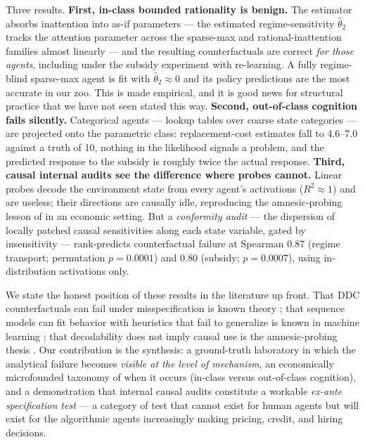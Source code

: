 \documentclass[11pt]{article}
\newcommand{\that}[1]{\widehat{\theta}_{#1}}
\begin{document}
Three results. \textbf{First, in-class bounded rationality is benign.} The
estimator absorbs inattention into as-if parameters --- the estimated
regime-sensitivity $\that{2}$ tracks the attention parameter across the
sparse-max and rational-inattention families almost linearly --- and the
resulting counterfactuals are correct \emph{for those agents}, including
under the subsidy experiment with re-learning. A fully regime-blind
sparse-max agent is fit with $\that{2}\approx 0$ and its policy predictions
are the most accurate in our zoo. This is \citet{fosgerau2020} made
empirical, and it is good news for structural practice that we have not seen
stated this way. \textbf{Second, out-of-class cognition fails silently.}
Categorical agents --- lookup tables over coarse state categories --- are
projected onto the parametric class: replacement-cost estimates fall to
4.6--7.0 against a truth of 10, nothing in the likelihood signals a problem,
and the predicted response to the subsidy is roughly twice the actual
response. \textbf{Third, causal internal audits see the difference where
probes cannot.} Linear probes decode the environment state from every
agent's activations ($R^2 \approx 1$) and are useless; their directions are
causally idle, reproducing the amnesic-probing lesson of \citet{elazar2021}
in an economic setting. But a \emph{conformity audit} --- the dispersion of
locally patched causal sensitivities along each state variable, gated by
insensitivity --- rank-predicts counterfactual failure at Spearman 0.87
(regime transport; permutation $p = 0.0001$) and 0.80 (subsidy;
$p = 0.0007$), using in-distribution activations only.

We state the honest position of these results in the literature up front.
That DDC counterfactuals can fail under misspecification is known theory
\citep{magnacthesmar2002, kalouptsidi2021, bugniura2019}; that sequence
models can fit behavior with heuristics that fail to generalize is known in
machine learning \citep{vafa2024, vafa2025}; that decodability does not
imply causal use is the amnesic-probing thesis \citep{elazar2021}. Our
contribution is the synthesis: a ground-truth laboratory in which the
analytical failure becomes \emph{visible at the level of mechanism}, an
economically microfounded taxonomy of when it occurs (in-class versus
out-of-class cognition), and a demonstration that internal causal audits
constitute a workable \emph{ex-ante specification test} --- a category of
test that cannot exist for human agents but will exist for the algorithmic
agents increasingly making pricing, credit, and hiring decisions.
\end{document}
